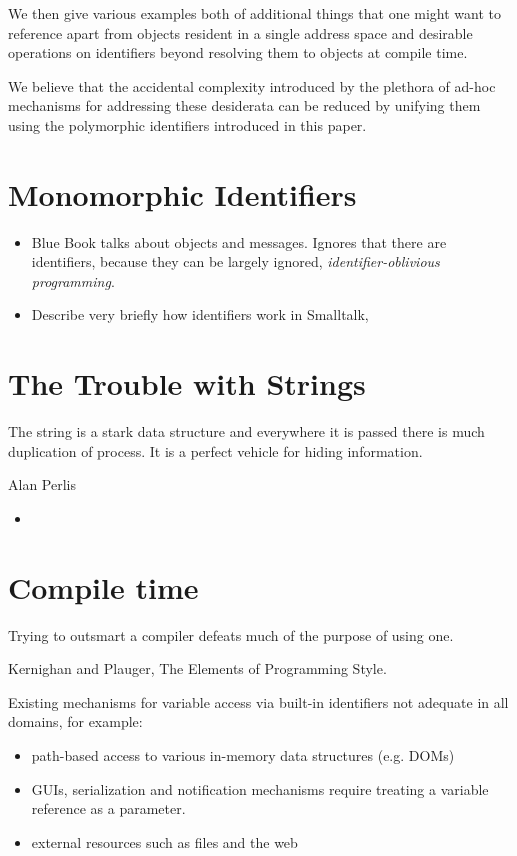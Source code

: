 \documentclass[preprint,authoryear,10pt]{sigplanconf}
\begin{document}
We then give various examples both of additional things that one might want to reference 
 apart from objects resident in a single address space  and
desirable operations on identifiers beyond resolving them to objects at compile time.

We believe that the accidental complexity \cite{Brooks87nosilver} introduced by the
plethora of ad-hoc mechanisms for addressing these desiderata can be reduced 
by unifying them using the polymorphic identifiers introduced in this paper.


\section{Monomorphic Identifiers}





\begin{itemize}
\item Blue Book talks about objects and messages.   Ignores that there are identifiers, because
	they can be largely ignored, {\em identifier-oblivious programming}.
\item Describe very briefly how identifiers work in Smalltalk, 
\end{itemize}


\section{The Trouble with Strings}
\epigraph{The string is a stark data structure and everywhere it is passed there is much duplication of process. It is a perfect vehicle for hiding information.}{Alan Perlis}

\begin{itemize}

\item 

\end{itemize}

\section{Compile time}
\epigraph{Trying to outsmart a compiler defeats much of the purpose of using one.}{Kernighan and Plauger, The Elements of Programming Style.}




Existing mechanisms for variable access via built-in identifiers not adequate in 
all domains, for example:
 \begin{itemize}

\item path-based access to various in-memory data structures (e.g. DOMs)
\item GUIs, serialization and notification mechanisms require treating a variable
	reference as a parameter.
\item external resources such as files and the web

\end{itemize}
\end{document}

